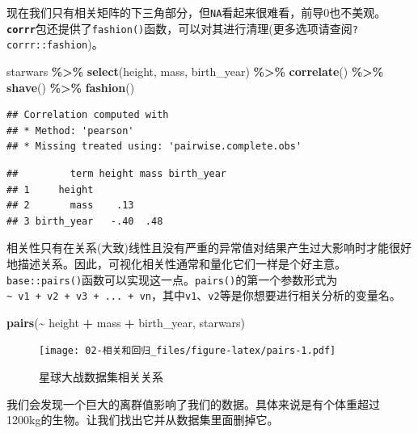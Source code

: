 \documentclass[
]{book}
\newenvironment{Shaded}{\begin{snugshade}}{\end{snugshade}}
\newcommand{\FunctionTok}[1]{\textcolor[rgb]{0.13,0.29,0.53}{\textbf{#1}}}
\newcommand{\NormalTok}[1]{#1}
\newcommand{\SpecialCharTok}[1]{\textcolor[rgb]{0.81,0.36,0.00}{\textbf{#1}}}
\begin{document}
现在我们只有相关矩阵的下三角部分，但\texttt{NA}看起来很难看，前导0也不美观。\textbf{\texttt{corrr}}包还提供了\texttt{fashion()}函数，可以对其进行清理(更多选项请查阅\texttt{?corrr::fashion})。

\begin{Shaded}
\begin{Highlighting}[]
\NormalTok{starwars }\SpecialCharTok{\%\textgreater{}\%}
  \FunctionTok{select}\NormalTok{(height, mass, birth\_year) }\SpecialCharTok{\%\textgreater{}\%}
  \FunctionTok{correlate}\NormalTok{() }\SpecialCharTok{\%\textgreater{}\%}
  \FunctionTok{shave}\NormalTok{() }\SpecialCharTok{\%\textgreater{}\%}
  \FunctionTok{fashion}\NormalTok{()}
\end{Highlighting}
\end{Shaded}

\begin{verbatim}
## Correlation computed with
## * Method: 'pearson'
## * Missing treated using: 'pairwise.complete.obs'
\end{verbatim}

\begin{verbatim}
##         term height mass birth_year
## 1     height                       
## 2       mass    .13                
## 3 birth_year   -.40  .48
\end{verbatim}

相关性只有在关系(大致)线性且没有严重的异常值对结果产生过大影响时才能很好地描述关系。因此，可视化相关性通常和量化它们一样是个好主意。\texttt{base::pairs()}函数可以实现这一点。\texttt{pairs()}的第一个参数形式为\texttt{\textasciitilde{}\ v1\ +\ v2\ +\ v3\ +\ ...\ +\ vn}，其中\texttt{v1}、\texttt{v2}等是你想要进行相关分析的变量名。

\begin{Shaded}
\begin{Highlighting}[]
\FunctionTok{pairs}\NormalTok{(}\SpecialCharTok{\textasciitilde{}}\NormalTok{ height }\SpecialCharTok{+}\NormalTok{ mass }\SpecialCharTok{+}\NormalTok{ birth\_year, starwars)}
\end{Highlighting}
\end{Shaded}

\begin{figure}
\centering
\texttt{[image: 02-相关和回归\_files/figure-latex/pairs-1.pdf]}
\caption{\label{fig:pairs}星球大战数据集相关关系}
\end{figure}

我们会发现一个巨大的离群值影响了我们的数据。具体来说是有个体重超过1200kg的生物。让我们找出它并从数据集里面删掉它。
\end{document}
